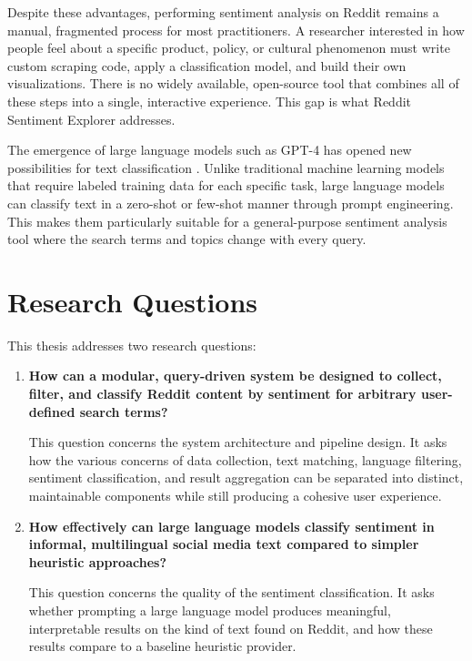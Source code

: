 Despite these advantages, performing sentiment analysis on Reddit remains a manual, fragmented process for most practitioners. A researcher interested in how people feel about a specific product, policy, or cultural phenomenon must write custom scraping code, apply a classification model, and build their own visualizations. There is no widely available, open-source tool that combines all of these steps into a single, interactive experience. This gap is what Reddit Sentiment Explorer addresses.

The emergence of large language models such as GPT-4 has opened new possibilities for text classification \cite{brown2020language}. Unlike traditional machine learning models that require labeled training data for each specific task, large language models can classify text in a zero-shot or few-shot manner through prompt engineering. This makes them particularly suitable for a general-purpose sentiment analysis tool where the search terms and topics change with every query.

\section{Research Questions}
\label{sec:research_questions}

This thesis addresses two research questions:

\begin{enumerate}
    \item \textbf{How can a modular, query-driven system be designed to collect, filter, and classify Reddit content by sentiment for arbitrary user-defined search terms?}

    This question concerns the system architecture and pipeline design. It asks how the various concerns of data collection, text matching, language filtering, sentiment classification, and result aggregation can be separated into distinct, maintainable components while still producing a cohesive user experience.

    \item \textbf{How effectively can large language models classify sentiment in informal, multilingual social media text compared to simpler heuristic approaches?}

    \begin{sloppypar}
    This question concerns the quality of the sentiment classification. It asks whether prompting a large language model produces meaningful, interpretable results on the kind of text found on Reddit, and how these results compare to a baseline heuristic provider.
    \end{sloppypar}
\end{enumerate}

